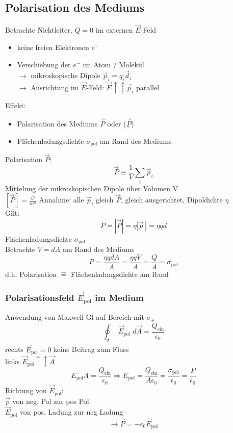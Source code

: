\documentclass[titlepage,12pt,a4paper,ngerman]{report}
\newcommand{\tx}[1]{\textrm{#1}}
\begin{document}
\subsection{Polarisation des Mediums}
Betrachte Nichtleiter, $Q=0$ im externen $\vec{E}$-Feld
\begin{itemize}
\item keine freien Elektronen $e^-$
\item Verschiebung der $e^-$ im Atom / Molekül.\\
$\rightarrow$ mikroskopische Dipole $\vec{p}_i = q_i \vec{d}_i$\\
$\rightarrow$ Ausrichtung im $\vec{E}$-Feld: $\vec{E} \uparrow \uparrow \vec{p}_i$ parallel
\end{itemize}
Effekt:
\begin{itemize}
\item Polarisation des Mediums $\vec{P}$ oder ($\underline{\vec{P}}$)
\item Flächenladungsdichte $\sigma_{\tx{pol}} $ am Rand des Mediums
\end{itemize}
Polarisation $\vec{P}$: $$\vec{P} \equiv \frac{1}{V} \sum_i \vec{p}_i$$ Mittelung der mikroskopischen Dipole über Volumen V\\
$[\vec{P}] = \frac{C}{m^2}$
Annahme: alle $\vec{p}_i$ gleich $\vec{P}$, gleich ausgerichtet, Dipoldichte $\eta$\\
Gilt: $$P = |\vec{P}| = \eta |\vec{p}\,| = \eta q d$$
Flächenladungsdichte $\sigma_{\tx{pol}}$\\
Betrachte $V = dA$ am Rand des Mediums
$$ P = \frac{\eta q d A}{A} = \frac{\eta q V }{A} = \frac{Q}{A} = \sigma_{\tx{pol}}$$
d.h. Polarisation $\widehat{=}$ Flächenladungsdichte am Rand
\subsubsection{Polarisationsfeld $\vec{E}_{\tx{pol}}$ im Medium}
Anwendung von Maxwell-Gl auf Bereich mit $\sigma_+$ 
$$\oint_{\sigma_+} \vec{E}_{\tx{pol}} \; d\vec{A} = \frac{Q_{\tx{ein}}}{\epsilon_0}$$
rechts $\vec{E}_{\tx{pol}} = 0$ keine Beitrag zum Fluss\\
links $ \vec{E}_{\tx{pol}} \uparrow \uparrow \vec{A}$\\
$$E_{\tx{pol}} A = \frac{Q_{\tx{ein}}}{\epsilon_0} \Rightarrow E_{\tx{pol}} = \frac{Q_{\tx{ein}}}{A \epsilon_0} = \frac{\sigma_{\tx{pol}}}{\epsilon_0} = \frac{P}{\epsilon_0}$$
Richtung von $\vec{E}_{\tx{pol}}$: \\
$\vec{p}$ von neg. Pol zur pos Pol\\
$ \vec{E}_{\tx{pol}}$ von pos. Ladung zur neg Ladung\\
$$ \rightarrow \vec{P} = - \epsilon_0 \vec{E}_{\tx{pol}}$$
\end{document}

